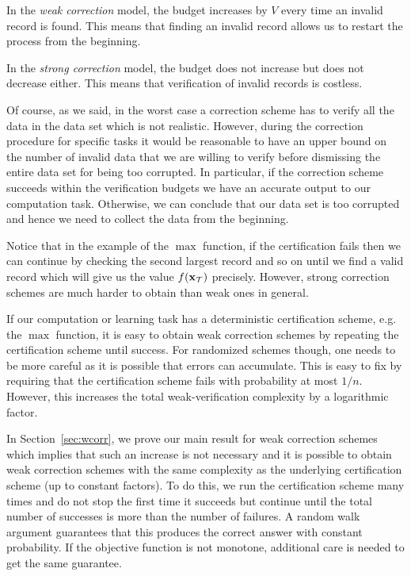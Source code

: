 In the \textit{weak correction} model, the budget increases by $V$ every time an invalid record is found. This means that finding an invalid record allows
us to restart the process from the beginning.

In the \textit{strong correction} model, the budget does not increase but does not decrease either. This means that verification of invalid records is
costless.

Of course, as we said, in the worst case a correction scheme has to verify all the data in the data set which is not realistic. However,  during the correction procedure for specific tasks it would be reasonable to have an upper bound on the number of invalid data that we are willing to verify before dismissing the entire data set for being too corrupted.
In particular, if the correction scheme
succeeds within the verification budgets we have an accurate output to our computation task. Otherwise, we can conclude that our data set is too corrupted and hence we need to collect the data from the beginning.
%

  Notice that in the example of the $\max$ function, if the certification fails then we can continue by checking the second largest record and so on
until we find a valid record which will give us the value $f(\mathbf{x}_{\mathcal{T}})$ precisely. %
However, strong correction schemes are much harder to obtain than weak ones in general.

  If our computation or learning task has a deterministic certification scheme, e.g. the $\max$ function, it is easy to obtain weak correction
schemes by repeating the certification scheme until success. For randomized schemes though, one needs to be more careful as it is possible that errors
can accumulate. This is easy to fix by requiring that the certification scheme fails with probability at most $1/n$. However, this increases the total
weak-verification complexity by a logarithmic factor.

  In Section~\ref{sec:wcorr}, we prove our main result for weak correction schemes which implies that such an increase is not necessary and it is
possible to obtain weak correction schemes with the same complexity as the underlying certification scheme (up to constant factors). To do this, we run
the certification scheme many times and do not stop the first time it succeeds but continue until the total number of successes is more than the number
of failures. A random walk argument guarantees that this produces the correct answer with constant probability. If the objective function is not
monotone, additional care is needed to get the same guarantee.

